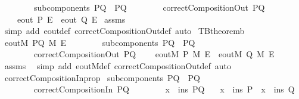 \begin{isabellebody}
\ \ \ \ \ \ \ \ {\isachardoublequoteopen}subcomponents\ PQ\ {\isacharequal}\ {\isacharbraceleft}P{\isacharcomma}Q{\isacharbraceright}{\isachardoublequoteclose}\isanewline
\ \ \ \ \ \ \ \ {\isachardoublequoteopen}correctCompositionOut\ PQ{\isachardoublequoteclose}\isanewline
{}\ \ \ \ {\isachardoublequoteopen}eout\ P\ E\ {\isasymor}\ eout\ Q\ E{\isachardoublequoteclose}\isanewline
%
\isadelimproof
%
\endisadelimproof
%
\isatagproof
{}\isamarkupfalse%
\ assms\ \isamarkupfalse%
\ {\isacharparenleft}simp\ add{\isacharcolon}\ eout{\isacharunderscore}def\ correctCompositionOut{\isacharunderscore}def{\isacharcomma}\ auto{\isacharparenright}%
\endisatagproof
{\isafoldproof}%
%
\isadelimproof
\isanewline
%
\endisadelimproof
\isanewline
{}\isamarkupfalse%
\ TBtheorem{}b{\isacharcolon}\isanewline
{}\ {\isachardoublequoteopen}eoutM\ PQ\ M\ E{\isachardoublequoteclose}\isanewline
\ \ \ \ \ \ \ \ {\isachardoublequoteopen}subcomponents\ PQ\ {\isacharequal}\ {\isacharbraceleft}P{\isacharcomma}Q{\isacharbraceright}{\isachardoublequoteclose}\isanewline
\ \ \ \ \ \ \ \ {\isachardoublequoteopen}correctCompositionOut\ PQ{\isachardoublequoteclose}\isanewline
{}\ \ \ \ {\isachardoublequoteopen}eoutM\ P\ M\ E\ {\isasymor}\ eoutM\ Q\ M\ E{\isachardoublequoteclose}\isanewline
%
\isadelimproof
%
\endisadelimproof
%
\isatagproof
{}\isamarkupfalse%
\ assms\ \isamarkupfalse%
\ {\isacharparenleft}simp\ add{\isacharcolon}\ eoutM{\isacharunderscore}def\ correctCompositionOut{\isacharunderscore}def{\isacharcomma}\ auto{\isacharparenright}%
\endisatagproof
{\isafoldproof}%
%
\isadelimproof
\isanewline
%
\endisadelimproof
\isanewline
{}\isamarkupfalse%
\ correctCompositionIn{\isacharunderscore}prop{}{\isacharcolon}\isanewline
{}\ {\isachardoublequoteopen}subcomponents\ PQ\ {\isacharequal}\ {\isacharbraceleft}P{\isacharcomma}Q{\isacharbraceright}{\isachardoublequoteclose}\isanewline
\ \ \ \ \ \ \ \ {\isachardoublequoteopen}correctCompositionIn\ PQ{\isachardoublequoteclose}\isanewline
\ \ \ \ \ \ \ \ {\isachardoublequoteopen}x\ {\isasymin}\ {\isacharparenleft}ins\ PQ{\isacharparenright}{\isachardoublequoteclose}\isanewline
{}\ \ \ {\isachardoublequoteopen}{\isacharparenleft}x\ {\isasymin}\ {\isacharparenleft}ins\ P{\isacharparenright}{\isacharparenright}\ {\isasymor}\ {\isacharparenleft}x\ {\isasymin}\ {\isacharparenleft}ins\ Q{\isacharparenright}{\isacharparenright}{\isachardoublequoteclose}\ \isanewline

\end{isabellebody}
